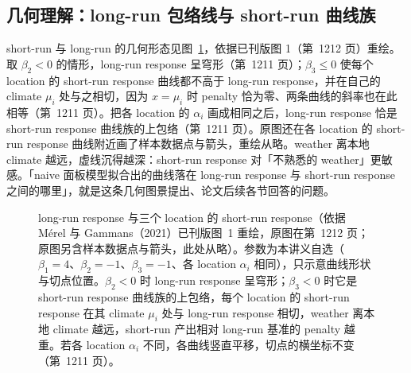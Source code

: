 \subsection{几何理解：long-run 包络线与 short-run 曲线族}

short-run 与 long-run 的几何形态见图~\ref{fig:cca-lrsr}，依据已刊版图 1（第~1212 页）重绘。取 $\beta_2<0$ 的情形，long-run response 呈穹形（第~1211 页）；$\beta_3\le0$ 使每个 location 的 short-run response 曲线都不高于 long-run response，并在自己的 climate $\mu_i$ 处与之相切，因为 $x=\mu_i$ 时 penalty 恰为零、两条曲线的斜率也在此相等（第~1211 页）。把各 location 的 $\alpha_i$ 画成相同之后，long-run response 恰是 short-run response 曲线族的上包络（第~1211 页）。原图还在各 location 的 short-run response 曲线附近画了样本数据点与箭头，重绘从略。weather 离本地 climate 越远，虚线沉得越深：short-run response 对「不熟悉的 weather」更敏感。「naive 面板模型拟合出的曲线落在 long-run response 与 short-run response 之间的哪里」，就是这条几何图景提出、论文后续各节回答的问题。

\begin{figure}[htbp]
  \centering
  \caption{long-run response 与三个 location 的 short-run response（依据 Mérel 与 Gammans（2021）已刊版图~1 重绘，原图在第~1212 页；原图另含样本数据点与箭头，此处从略）。参数为本讲义自选（$\beta_1=4$、$\beta_2=-1$、$\beta_3=-1$、各 location $\alpha_i$ 相同），只示意曲线形状与切点位置。$\beta_2<0$ 时 long-run response 呈穹形；$\beta_3<0$ 时它是 short-run response 曲线族的上包络，每个 location 的 short-run response 在其 climate $\mu_i$ 处与 long-run response 相切，weather 离本地 climate 越远，short-run 产出相对 long-run 基准的 penalty 越重。若各 location $\alpha_i$ 不同，各曲线竖直平移，切点的横坐标不变（第~1211 页）。}
  \label{fig:cca-lrsr}
\end{figure}

